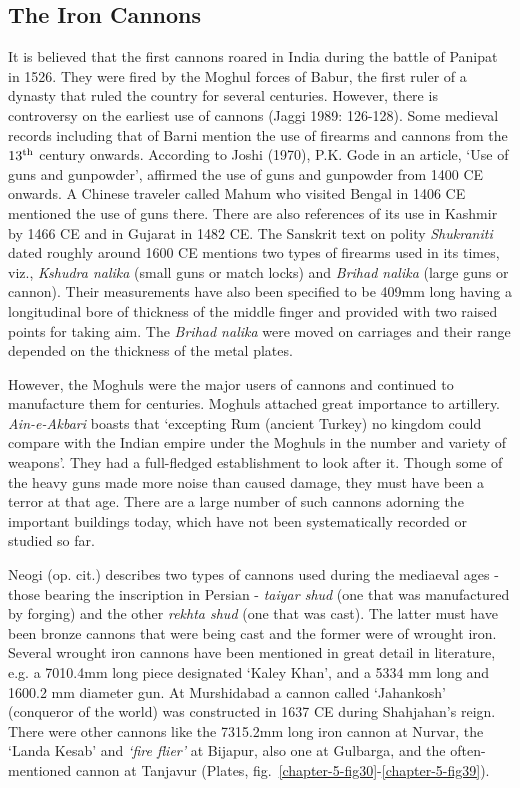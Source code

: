\vspace{-.3cm}

\subsection*{The Iron Cannons}\label{chapter5-subsection-2.1}

\vspace{-.2cm}

 It is believed that the first cannons roared in India during the battle of Panipat in 1526. They were fired by the Moghul forces of Babur, the first ruler of a dynasty that ruled the country for several centuries. However, there is controversy on the earliest use of cannons (Jaggi 1989: 126-128). Some medieval records including that of Barni mention the use of firearms and cannons from the $13^{\rm th}$ century onwards. According to Joshi (1970), P.K. Gode in an article, `Use of guns and gunpowder', affirmed the use of guns and gunpowder from 1400 CE onwards. A Chinese traveler called Mahum who visited Bengal in 1406 CE mentioned the use of guns there. There are also references of its use in Kashmir by 1466 CE and in Gujarat in 1482  CE. The Sanskrit text on polity {\it Shukraniti} dated roughly around 1600  CE mentions two types of firearms used in its times, viz., {\it Kshudra nalika} (small guns or match locks) and {\it Brihad nalika} (large guns or cannon). Their measurements have also been specified to be 409mm long having a longitudinal bore of thickness of the middle finger and provided with two raised points for taking aim. The {\it Brihad nalika} were moved on carriages and their range depended on the thickness of the metal plates.

However, the Moghuls were the major users of cannons and continued to manufacture them for centuries. Moghuls attached great importance to artillery. {\it Ain-e-Akbari} boasts that `excepting Rum (ancient Turkey) no kingdom could compare with the Indian empire under the Moghuls in the number and variety of weapons'. They had a full-fledged establishment to look after it. Though some of the heavy guns made more noise than caused damage, they must have been a terror at that age. There are a large number of such cannons adorning the important buildings today, which have not been systematically recorded or studied so far. 

Neogi (op. cit.) describes two types of cannons used during the mediaeval ages - those bearing the inscription in Persian - {\it taiyar shud} (one that was manufactured by forging) and the other {\it rekhta shud} (one that was cast). The latter must have been bronze cannons that were being cast and the former were of wrought iron. Several wrought iron cannons have been mentioned in great detail in literature, e.g. a 7010.4mm long piece designated ‘Kaley Khan’, and a 5334 mm long and 1600.2 mm diameter gun. At Murshidabad a cannon called ‘Jahankosh’ (conqueror of the world) was constructed in 1637 CE during Shahjahan’s reign. There were other cannons like the 7315.2mm long iron cannon at Nurvar, the ‘Landa Kesab’ and {\it ‘fire flier’} at Bijapur, also one at Gulbarga, and the often-mentioned cannon at Tanjavur (Plates, fig.~\ref{chapter-5-fig30}-\ref{chapter-5-fig39}).


